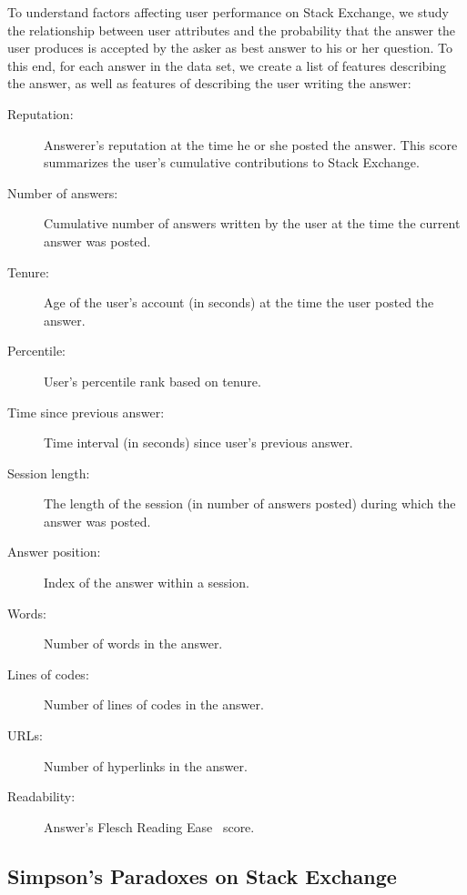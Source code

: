 To understand factors affecting user performance on Stack Exchange, we study the relationship between user attributes and the probability that the answer the user produces is accepted by the asker as best answer to his or her question.
To this end, for each answer in the data set, we create a list of features describing the answer, as well as features of describing the user writing the answer:
\begin{description}
  \item[Reputation:] Answerer's {reputation} at the time he or she posted the answer. %
   This score summarizes the user's cumulative contributions to Stack Exchange.
  \item[Number of answers:] Cumulative number of answers written by the user at the time the current answer was posted.
  \item[Tenure:] Age of the user's account (in seconds) at the time the user posted the answer. %
  \item[Percentile:] User's percentile rank based on tenure.
  \item[Time since previous answer:] Time interval (in seconds) since user's previous answer.
  \item[Session length:] The length of the session (in number of answers posted) during which the answer was posted.
  \item[Answer position:] Index of the answer within a session.
  \item[Words:] Number of words in the answer.
  \item[Lines of codes:] Number of lines of codes in the answer.
  \item[URLs:] Number of hyperlinks in the answer.
  \item[Readability:] Answer's Flesch Reading Ease~\cite{Readability} score.
  \end{description}


\subsection{Simpson's Paradoxes on Stack Exchange}

